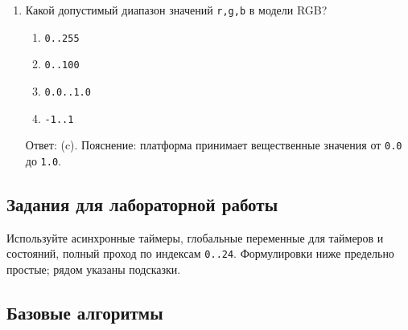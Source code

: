 \begin{enumerate}
  \item Какой допустимый диапазон значений \verb|r,g,b| в модели RGB?
  \begin{enumerate}[label=(\alph*)]
    \item \verb|0..255| \item \verb|0..100| \item \verb|0.0..1.0| \item \verb|-1..1|
  \end{enumerate}
  Ответ: (c). Пояснение: платформа принимает вещественные значения от \verb|0.0| до \verb|1.0|.
\end{enumerate}

\subsection{Задания для лабораторной работы}
Используйте асинхронные таймеры, глобальные переменные для таймеров и состояний, полный проход по индексам \verb|0..24|. Формулировки ниже предельно простые; рядом указаны подсказки.
\subsection{Базовые алгоритмы}

